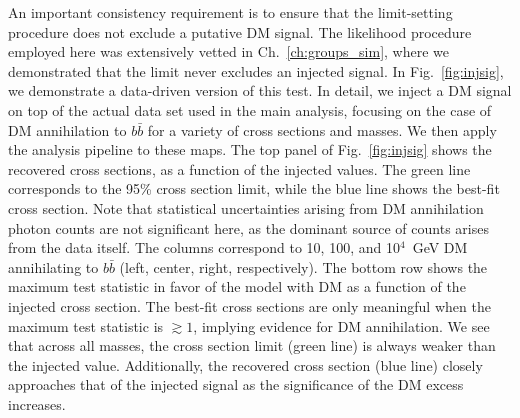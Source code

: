  An important consistency requirement is to ensure that the limit-setting procedure does not exclude a putative DM signal. The likelihood procedure employed here was extensively vetted in Ch.~\ref{ch:groups_sim}, where we demonstrated that the limit never excludes an injected signal.  In Fig.~\ref{fig:injsig}, we demonstrate a data-driven version of this test. In detail, we inject a DM signal on top of the actual data set used in the main analysis, focusing on the case of DM annihilation to $b \bar{b}$ for a variety of cross sections and masses. We then apply the analysis pipeline to these maps.  The top panel of Fig.~\ref{fig:injsig} shows the recovered cross sections, as a function of the injected values.  The green line corresponds to the 95\% cross section limit, while the blue line shows the best-fit cross section.  Note that statistical uncertainties arising from DM annihilation photon counts are not significant here, as the dominant source of counts arises from the data itself. 
The columns correspond to 10, 100, and 10$^4$~GeV DM annihilating to $b \bar b$ (left, center, right, respectively).  The bottom row shows the maximum test statistic in favor of the model with DM as a function of the injected cross section.  The best-fit cross sections are only meaningful when the maximum test statistic is $\gtrsim 1$, implying evidence for DM annihilation.     
We see that across all masses, the cross section limit  (green line) is always weaker than the injected value.  Additionally, the recovered cross section (blue line) closely approaches that of the injected signal as the significance of the DM excess  increases.   
\vspace{0.1in}

